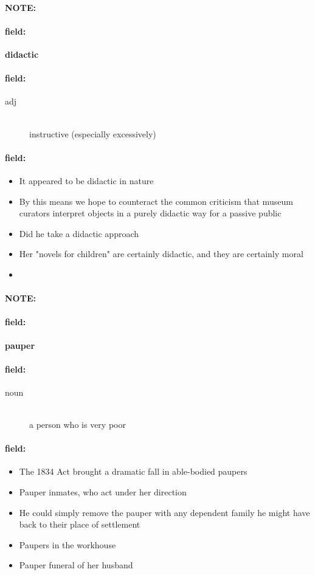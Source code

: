 \documentclass[12pt]{article}
\newenvironment{note}{\paragraph{NOTE:}}{}
\newenvironment{field}{\paragraph{field:}}{}
\begin{document}
\begin{note}
\begin{field}
\textbf{\large didactic}
\end{field}


\begin{field}
\begin{description}
\item[adj] \hfill \\ 
instructive (especially excessively)

\end{description}
\end{field}

\begin{field}
\begin{itemize}
\item It appeared to be didactic in nature
\item By this means we hope to counteract the common criticism that museum curators interpret objects in a purely didactic way for a passive public
\item Did he take a didactic approach
\item Her "novels for children" are certainly didactic, and they are certainly moral
\item 
\end{itemize}
\end{field}
\end{note}
\begin{note}
\begin{field}
\textbf{\large pauper}
\end{field}


\begin{field}
\begin{description}
\item[noun] \hfill \\ 
a person who is very poor

\end{description}
\end{field}

\begin{field}
\begin{itemize}
\item The 1834 Act brought a dramatic fall in able-bodied paupers
\item Pauper inmates, who act under her direction
\item He could simply remove the pauper with any dependent family he might have back to their place of settlement
\item Paupers in the workhouse
\item Pauper funeral of her husband
\end{itemize}
\end{field}
\end{note}
\end{document}
